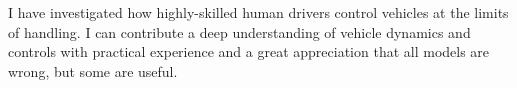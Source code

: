 
\begin{cvparagraph}
I have investigated how highly-skilled human drivers control vehicles at the limits of handling.
I can contribute a deep understanding of vehicle dynamics and controls with practical experience and a great appreciation that all models are wrong, but some are useful.
\end{cvparagraph}
